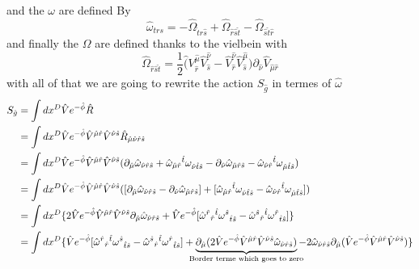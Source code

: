 \documentclass{article}
\begin{document}
and the $\omega$ are defined By
\begin{equation*} \label{expomega}
    \hat \omega_{trs } = - \hat\Omega_{\hat t\hat r \hat s} +\hat\Omega_{\hat r\hat s \hat t } -\hat\Omega_{\hat s\hat t \hat r}
\end{equation*}
and finally the $\Omega$ are defined thanks to the vielbein with
\begin{equation*}\label{expOmega}
    \hat\Omega_{\hat r\hat s \hat t } = \frac{1}{2}\hat (V^{\hat \mu}_{\hat r}\hat V^{\hat \nu}_{\hat s} -\hat V^{\hat \nu}_{\hat r} \hat V^{\hat \mu}_{\hat s})\partial_{\hat \nu} \hat V_{\hat \mu \hat r}
\end{equation*}
with all of that we are going to rewrite the action $S_{\hat g}$ in termes of $\hat \omega$
\begin{equation}
    \begin{aligned}
        S_{\hat g} &= \int d x^D\hat V  e^{-\hat \phi} \hat R\\
        &= \int d x^D\hat V  e^{-\hat \phi} \hat V^{\hat \mu \hat r} \hat V^{\hat \nu \hat s} \hat R_{\hat \mu \hat \nu \hat r \hat s}\\
        &= \int d x^D\hat V  e^{-\hat \phi} \hat V^{\hat \mu \hat r} \hat V^{\hat \nu \hat s} (\partial_{\hat \mu } \hat \omega_{\hat \nu \hat r \hat s}+ \hat \omega_{\hat\mu \hat r}{}^{\hat t}\omega_{\hat\nu \hat t \hat s} -\partial_{\hat \nu } \hat \omega_{\hat \mu \hat r \hat s}- \hat \omega_{\hat\nu \hat r}{}^{\hat t}\omega_{\hat\mu \hat t \hat s})\\
        &= \int d x^D\hat V e^{-\hat \phi} \hat V^{\hat \mu \hat r} \hat V^{\hat \nu \hat s} ([\partial_{\hat \mu } \hat \omega_{\hat \nu \hat r \hat s} -\partial_{\hat \nu } \hat \omega_{\hat \mu \hat r \hat s}]+ [\hat \omega_{\hat\mu \hat r}{}^{\hat t}\omega_{\hat\nu \hat t \hat s} - \hat \omega_{\hat\nu \hat r}{}^{\hat t}\omega_{\hat\mu \hat t \hat s}])\\
        &= \int d x^D\{  2\hat V e^{-\hat \phi} \hat V^{\hat \mu \hat r} \hat V^{\hat \nu \hat s}\partial_{\hat \mu } \hat \omega_{\hat \nu \hat r \hat s}+ \hat V e^{-\hat \phi}[\hat \omega^{\hat r}{}_{\hat r}{}^{\hat t}\omega^{\hat s}{}_{\hat t \hat s} - \hat \omega^{\hat s}{}_{ \hat r}{}^{\hat t}\omega^{\hat r}{}_{ \hat t \hat s}] \}\\
        &= \int d x^D\{  \hat V e^{-\hat \phi}[\hat \omega^{\hat r}{}_{\hat r}{}^{\hat t}\omega^{\hat s}{}_{\hat t \hat s} - \hat \omega^{\hat s}{}_{ \hat r}{}^{\hat t}\omega^{\hat r}{}_{ \hat t \hat s}]+\underbrace{\partial_{\hat \mu } (2\hat V e^{-\hat \phi} \hat V^{\hat \mu \hat r} \hat V^{\hat \nu \hat s}\hat \omega_{\hat \nu \hat r \hat s})}_{\mathclap{\text{Border terme which goes to zero}}}- 2 \hat \omega_{\hat \nu \hat r \hat s}\partial_{\hat \mu}(\hat V e^{-\hat \phi} \hat V^{\hat \mu \hat r} \hat V^{\hat \nu \hat s}) \}\\

\end{aligned}
\end{equation}
\end{document}
